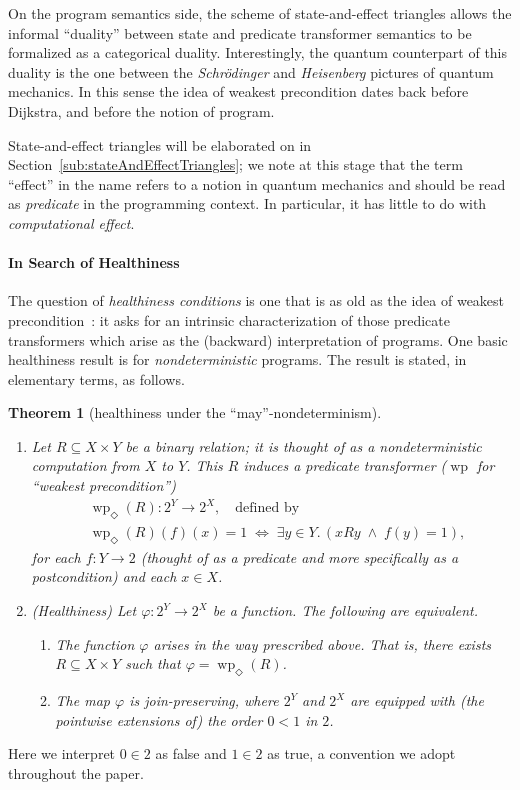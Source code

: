 \documentclass[9pt, preprint]{sigplanconf}
\theoremstyle{theorem}
\newtheorem{theorem}{Theorem}[section]
\theoremstyle{definition}
\newcommand{\wpre}{\mathop{\mathrm{wp}}\nolimits}
\begin{document}
On the program semantics side,
the scheme of state-and-effect triangles
allows
the informal ``duality'' between  state and predicate transformer
semantics to be formalized as a
categorical duality. Interestingly, the quantum counterpart of this
duality is the one between the \emph{Schr\"{o}dinger} and
\emph{Heisenberg} pictures of quantum mechanics. In this sense the idea
of weakest precondition dates back before Dijkstra, and before the
notion of program.

 State-and-effect triangles will be
elaborated on in Section~\ref{sub:stateAndEffectTriangles}; we note at this
stage that the term ``effect'' in the name refers to a notion in quantum
mechanics and should be read as \emph{predicate} in the programming
context. In particular, it has little to do with \emph{computational
effect}.


\paragraph{In Search of Healthiness}
The question of \emph{healthiness conditions} is one that is as old as
the idea of weakest precondition~\cite{Dijkstra76}: it asks for an intrinsic characterization of those predicate
  transformers which arise as the (backward) interpretation of
  programs.
One basic healthiness result is for \emph{nondeterministic}
programs.  The result is stated, in elementary terms, as follows.
\begin{theorem}[healthiness under the ``may''-nondeterminism]
\label{thm:healthiness-nondet-elementary}
 \begin{enumerate}
  \item Let $R\subseteq X\times Y$ be a binary relation; it is thought
	of as a nondeterministic computation from  $X$ to $Y$. This
	$R$ induces a predicate transformer ($\wpre$ for
	``weakest precondition'')
\begin{align*}
	 &	\wpre_{\Diamond}(R)\colon 2^{Y}\longrightarrow 2^{X},
	 \quad\text{defined by}\quad
	 \\
	 &
	 \wpre_{\Diamond}(R)(f)(x)=1
	 \;\Longleftrightarrow\;
	 \exists y\in Y.\, (xRy\;\land\;f(y)=1),
	\end{align*}
	for each $f\colon Y\to 2$ (thought of as a \emph{predicate} and
	more specifically as a \emph{postcondition}) and each $x\in X$.
  \item (Healthiness) Let $\varphi\colon 2^{Y}\to 2^{X}$ be a function. The following
	are equivalent.
	\begin{enumerate}
	 \item The function $\varphi$ arises  in
	       the way prescribed above. That is, there exists
	       $R\subseteq X\times Y$ such that
	       $\varphi=\wpre_{\Diamond}(R)$.
	 \item The map $\varphi$ is \emph{join-preserving}, where $2^{Y}$ and
	       $2^{X}$
	       are equipped with (the pointwise extensions of) the order
	       $0<1$ in $2$.
	\end{enumerate}
\end{enumerate}
\end{theorem}
\noindent
Here we
interpret $0\in 2$ as false and $1\in
2$ as true, a convention we adopt throughout the paper.
\end{document}
